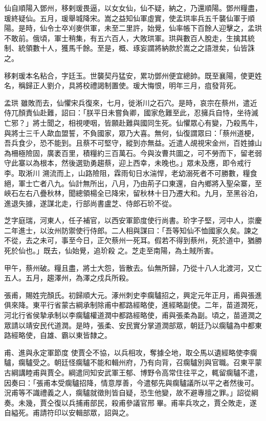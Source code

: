 \begin{pinyinscope}
 仙自順陽入鄧州，移剌瑗畏逼，以女女仙，仙不疑，納之，乃還順陽。鄧州糧盡，瑗終疑仙。五月，瑗舉城降宋。嵩之益知仙軍虛實，使孟珙率兵五千襲仙軍于順陽。是時，仙令士卒刈麥供軍，未至二里許，始覺，仙率帳下百餘人迎擊之，孟珙不敢前。俄頃，軍士稍集，有五六百人，大敗珙軍。珙與數百人脫走，生擒其統制、統領數十人，獲馬千餘。至是，概、琢妄謂將納款於嵩之之語泄矣，仙皆誅之。



 移剌瑗本名粘合，字廷玉。世襲契丹猛安，累功鄧州便宜總帥。既至襄陽，使更姓名，稱歸正人劉介，具將校禮謁制置使。瑗大悔恨，明年三月，疽發背死。



 孟珙
 雖敗而去，仙懼宋兵復來，七月，徙淅川之石穴。是時，哀宗在蔡州，遣近侍兀顏責仙赴難，詔曰：「朕平日未嘗負卿，國家危難至此，忍擁兵自恃，坐待滅亡邪？」將士聞之，相視哽咽，皆願赴難與國同生死。仙懼眾心有變，乃殺馬牛，與將士三千人歃血盟誓，不負國家，眾乃大喜。無何，仙復謂眾曰：「蔡州道梗，吾兵食少，恐不能到。且蔡不可堅守，縱到亦無益。近遣人覘視宋金州，百姓據山為柵極險固，廣袤百里，積糧約三百萬石。今與汝曹共圖之，可不勞而下，留老弱守此寨以為根本，然後選勁勇趨蔡，迎上西幸，未晚也。」眾未及應，即令戒行李。取淅川
 溯流而上，山路險阻，霖雨旬日水湍悍，老幼溺死者不可勝數，糧食絕，軍士亡者八九。仙計無所出，八月，乃由荊子口東還，自內鄉將入聖朵寨，至峽石左右八疊秋林，聞總領楊全已降宋，留秋林十日乃遷大和。九月，至黑谷泊，進退失據，遂謀北走，行部尚書盧芝、侍郎石玠不從。



 芝字庭瑞，河東人，任子補官，以西安軍節度使行尚書。玠字子堅，河中人，崇慶二年進士，以汝州防禦使行侍郎。二人相與謀曰：「吾等知仙不恤國家久矣。諫之不從，去之未可，事至今日，正欠蔡州一死耳。假若不得到蔡州，死於道中，猶勝死於仙也。」既去，仙始覺，追玠殺
 之。芝走至南陽，為土賊所害。



 甲午，蔡州破。糧且盡，將士大怨，皆散去。仙無所歸，乃從十八人北渡河，又亡五人。五月，趨澤州，為澤之戍兵所殺。



 張甫，賜姓完顏氏。初歸順大元。涿州刺史李瘸驢招之，興定元年正月，甫與張進俱來降。東平行省蒙古綱承制除甫中都路經略使，進經略副使。二年，苗道潤死，河北行省侯摯承制以李瘸驢權道潤中都路經略使，甫與張柔為副。頃之，苗道潤之眾請以靖安民代道潤。是時，張柔、安民實分掌道潤部眾，朝廷乃以瘸驢為中都東路經略使，自雄、霸以東皆隸之。



 甫、進與永定軍節度
 使賈仝不協，以兵相攻，奪據仝地，取仝馬以遺經略使李瘸驢，瘸驢受之。朝廷怪瘸驢不能和輯州府，乃有向背，召瘸驢別與官職。召東平蒙古綱講睦甫與賈仝。綱遣同知安武軍王郁、博野令高常住往平之，輒留瘸驢不遣，因奏曰：「張甫本受瘸驢招降，情意厚善，今遣郁先與瘸驢議所以平之者然後可。況甫等不識禮義之人，瘸驢就徵則皆自疑，恐生他變，故不避專擅之罪。」詔從綱奏。未幾，賈仝復以兵捕甫部民，殺甫參議官邢畢。甫率兵攻之，賈仝敗走，遂自縊死。甫請符印以安輯部眾，詔與之。




\end{pinyinscope}
